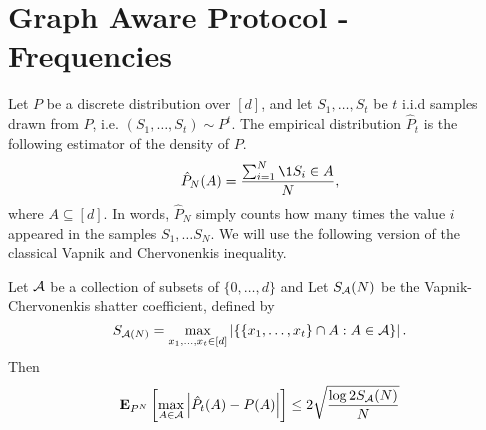 \section{Graph Aware Protocol - Frequencies}
Let $P$ be a discrete distribution over $[d]$, and let
$S_1, \ldots, S_t$ be $t$ i.i.d samples drawn from $P$, i.e.
$(S_1, \ldots, S_t) \sim P^t$.
The empirical distribution $\hat{P}_t$ is the following estimator of
the density of $P$.
\begin{equation}\label{eq:empirical_distribution}
  \hat{P}_N(A) = \frac{\sum_{i=1}^N \1{S_i \in A}}{N},
\end{equation}
where $A \subseteq [d]$. In words, $\hat{P}_N$ simply counts
how many times the value $i$ appeared in the samples $S_1, \ldots S_N$.
We will use the following version of the classical Vapnik and
Chervonenkis inequality.
\begin{lemma}\label{l:vc_inequality}
  Let $\mathcal{A}$ be a collection of subsets of $\{0,\ldots, d\}$ and
  Let $S_{\mathcal{A}}(N)$ be the Vapnik-Chervonenkis shatter coefficient, defined
  by
  \[
    S_{\mathcal{A}(N)} = \max_{x_1,\ldots, x_t \in [d]}
    \left| \{ \{x_1, \ldots, x_t\} \cap A : A \in \mathcal{A} \} \right|.
  \]
  Then
  \[
    \bm{\mathrm{E}}_{P^N} \left[ \max_{A \in \mathcal{A}} \left| \hat{P}_t(A) - P(A) \right| \right]
    \leq 2 \sqrt{\frac{\log{2 S_{\mathcal{A}}(N)}}{N}}
  \]
\end{lemma}

